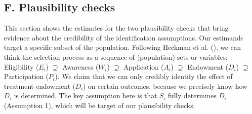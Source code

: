 \documentclass[
  11pt]{article}
\begin{document}
\clearpage

\subsection*{F. Plausibility checks}\label{f.-plausibility-checks}

This section shows the estimates for the two plausibility checks that
bring evidence about the credibility of the identification assumptions.
Our estimands target a specific subset of the population. Following
Heckman et al. (), we can think the
selection process as a sequence of (population) sets or variables:
Eligibility (\(E_i\)) \(\supseteq\) Awareness (\(W_i\)) \(\supseteq\)
Application (\(A_i\)) \(\supseteq\) Endowment (\(D_i\)) \(\supseteq\)
Participation (\(P_i\)). We claim that we can only credibly identify the
effect of treatment endowment (\(D_i\)) on certain outcomes, because we
precisely know how \(D_i\) is determined. The key assumption here is
that \(S_i\) fully determines \(D_i\) (Assumption 1), which will be
target of our plausibility checks.
\end{document}
